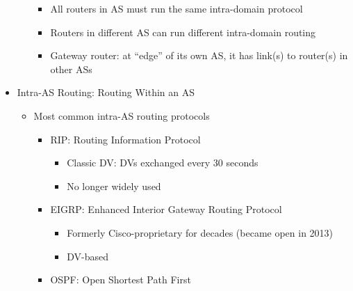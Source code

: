\begin{itemize}
\begin{itemize}
        \begin{itemize}

          \item All routers in AS must run the same intra-domain protocol

          \item Routers in different AS can run different intra-domain routing

          \item Gateway router: at ``edge'' of its own AS, it has link(s) to router(s) in other ASs

        \end{itemize}

    \end{itemize}

  \item Intra-AS Routing: Routing Within an AS

    \begin{itemize}

      \item Most common intra-AS routing protocols

        \begin{itemize}

          \item RIP: Routing Information Protocol

            \begin{itemize}

              \item Classic DV: DVs exchanged every 30 seconds

              \item No longer widely used

            \end{itemize}

          \item EIGRP: Enhanced Interior Gateway Routing Protocol

            \begin{itemize}

              \item Formerly Cisco-proprietary for decades (became open in 2013)

              \item DV-based

            \end{itemize}

          \item OSPF: Open Shortest Path First


\end{itemize}
\end{itemize}
\end{itemize}
